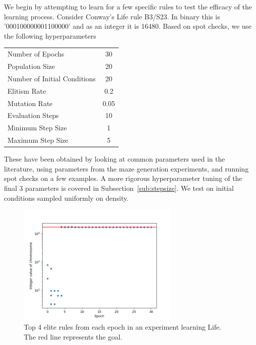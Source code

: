 We begin by attempting to learn for a few specific rules to test the efficacy of the learning process. Consider Conway's Life rule B3/S23. In binary this is '000100000001100000' and as an integer it is 16480. Based on spot checks, we use the following hyperparameters\\ 
\begin{center}
    \begin{tabular}{ l c }
        Number of Epochs & 30\\
        Population Size & 20\\
        Number of Initial Conditions & 20\\
        Elitism Rate & 0.2\\
        Mutation Rate & 0.05\\
        Evaluation Steps & 10\\
        Minimum Step Size & 1\\
        Maximum Step Size & 5\\
    \end{tabular}
\end{center}
These have been obtained by looking at common parameters used in the literature, using parameters from the maze generation experiments, and running spot checks on a few examples. A more rigorous hyperparameter tuning of the final 3 parameters is covered in Subsection~\ref{sub:stepsize}. We test on initial conditions sampled uniformly on density.\\ 

\begin{figure}[!h]
\centering
\includegraphics[width=0.7\textwidth]{images/life_like_eval/life-convgraph.png}
\caption{Top 4 elite rules from each epoch in an experiment learning Life. The red line represents the goal.}
\label{fig:life-convgraph}
\end{figure}


